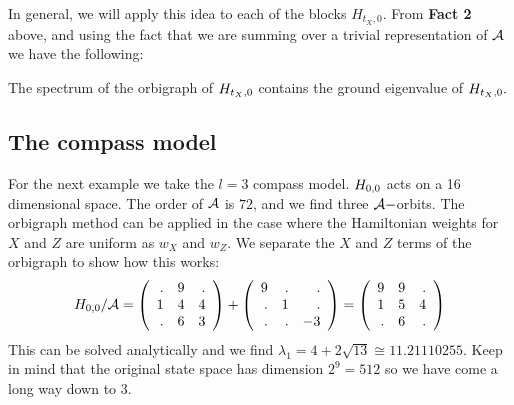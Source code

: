 In general, we will apply this idea to each of the blocks $H_{t_X,0}$.
From {\bf Fact 2} above, and using the fact that we are
summing over a trivial representation of $\mathcal{A}$ we have the following:
\begin{framed}
The spectrum of the orbigraph of $H_{t_X,0}$ contains the ground eigenvalue of $H_{t_X,0}.$
\end{framed}

%
\subsection{The compass model}
For the next example we take the $l=3$ compass model.
$H_{0,0}$ acts on a 16 dimensional space.
The order of $\mathcal{A}$ is $72$, and we find three $\mathcal{A}-$orbits.
The orbigraph method can be applied in the case
where the Hamiltonian weights for $X$ and $Z$ are uniform as $w_X$ and $w_Z.$
We separate the $X$ and $Z$ terms of the orbigraph to show
how this works:
$$
H_{0,0}/\mathcal{A} = 
\left(\begin{array}{rrr}
 . &  9 &  . \cr
  1 &  4 &  4 \cr
  . &  6 &  3
\end{array}\right) + 
\left(\begin{array}{rrr}
 9 &  . &  . \cr
  . &  1 &  . \cr
  . &  . &  -3
\end{array}\right)
=
\left(\begin{array}{rrr}
 9 &  9 &  . \cr
  1 &  5 &  4 \cr
  . &  6 &  .
\end{array}\right)
$$
This can be solved analytically and we find $\lambda_1 = 4+2\sqrt{13} \cong 11.21110255.$
Keep in mind that the original state space has dimension $2^9=512$ so we
have come a long way down to 3.


